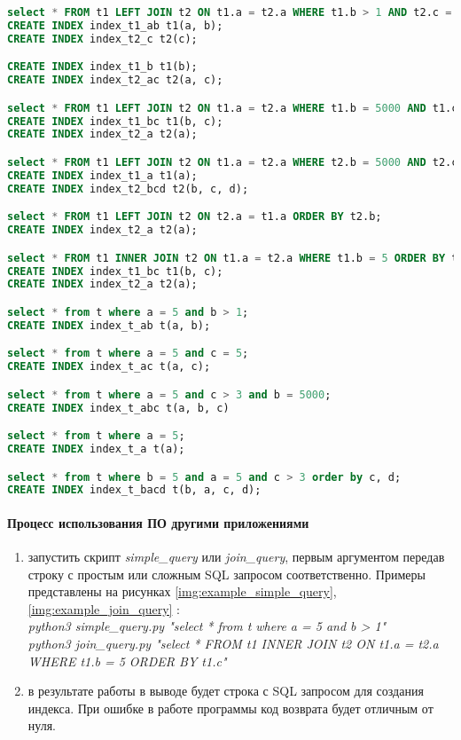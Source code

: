 \begin{lstlisting}[language=sql, caption={Пример выходного файла},label=example-output-file]
select * FROM t1 LEFT JOIN t2 ON t1.a = t2.a WHERE t1.b > 1 AND t2.c = 5;
CREATE INDEX index_t1_ab t1(a, b); 
CREATE INDEX index_t2_c t2(c);

CREATE INDEX index_t1_b t1(b); 
CREATE INDEX index_t2_ac t2(a, c);

select * FROM t1 LEFT JOIN t2 ON t1.a = t2.a WHERE t1.b = 5000 AND t1.c > 3 ORDER BY t2.c , t2.d;
CREATE INDEX index_t1_bc t1(b, c);
CREATE INDEX index_t2_a t2(a);

select * FROM t1 LEFT JOIN t2 ON t1.a = t2.a WHERE t2.b = 5000 AND t2.c > 3 ORDER BY t2.c, t2.d;
CREATE INDEX index_t1_a t1(a);
CREATE INDEX index_t2_bcd t2(b, c, d);

select * FROM t1 LEFT JOIN t2 ON t2.a = t1.a ORDER BY t2.b;
CREATE INDEX index_t2_a t2(a);

select * FROM t1 INNER JOIN t2 ON t1.a = t2.a WHERE t1.b = 5 ORDER BY t1.c;
CREATE INDEX index_t1_bc t1(b, c); 
CREATE INDEX index_t2_a t2(a);

select * from t where a = 5 and b > 1;
CREATE INDEX index_t_ab t(a, b);

select * from t where a = 5 and c = 5;
CREATE INDEX index_t_ac t(a, c);

select * from t where a = 5 and c > 3 and b = 5000;
CREATE INDEX index_t_abc t(a, b, c)

select * from t where a = 5;
CREATE INDEX index_t_a t(a);

select * from t where b = 5 and a = 5 and c > 3 order by c, d;
CREATE INDEX index_t_bacd t(b, a, c, d);
\end{lstlisting}


\paragraph{Процесс использования ПО другими приложениями}

\begin{enumerate}
\item запустить скрипт \textit{simple_query} или \textit{join_query}, первым аргументом передав строку с простым или сложным SQL запросом соответственно. Примеры представлены на рисунках \ref{img:example_simple_query}, \ref{img:example_join_query} :\\
\textit{python3 simple_query.py "select * from t where a = 5 and b > 1"} \\
\textit{python3 join_query.py "select * FROM t1 INNER JOIN t2 ON t1.a = t2.a WHERE t1.b = 5 ORDER BY t1.c"}

\item в результате работы в выводе будет строка с SQL запросом для создания индекса. При ошибке в работе программы код возврата будет отличным от нуля.
\end{enumerate}

